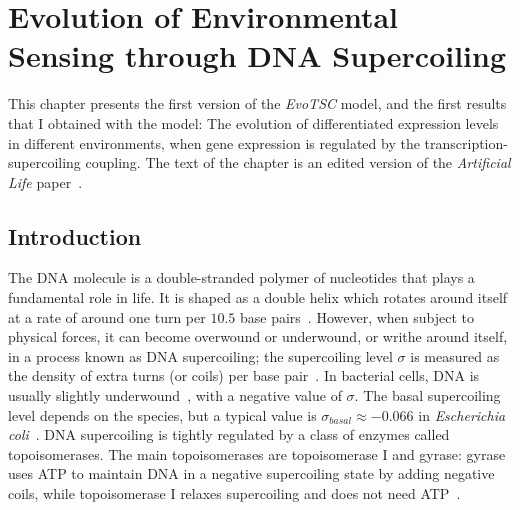 \chapter{Evolution of Environmental Sensing through DNA Supercoiling}
\label{chap:alife}

This chapter presents the first version of the \emph{EvoTSC} model, and the first results that I obtained with the model: The evolution of differentiated expression levels in different environments, when gene expression is regulated by the transcription-supercoiling coupling.
The text of the chapter is an edited version of the \emph{Artificial Life} paper~\citep{grohens2022a}.

\section{Introduction}
\label{sec:alife:intro}

The DNA molecule is a double-stranded polymer of nucleotides that plays a fundamental role in life.
It is shaped as a double helix which rotates around itself at a rate of around one turn per $10.5$ base pairs~\citep{krogh2018}.
However, when subject to physical forces, it can become overwound or underwound, or writhe around itself, in a process known as DNA supercoiling;
the supercoiling level $\sigma$ is measured as the density of extra turns (or coils) per base pair~\citep{duprey2021}.
In bacterial cells, DNA is usually slightly underwound~\citep{lal2016}, with a negative value of $\sigma$.
The basal supercoiling level depends on the species, but a typical value is $\sigma_{basal} \approx -0.066$ in \emph{Escherichia coli}~\citep{crozat2005}.
DNA supercoiling is tightly regulated by a class of enzymes called topoisomerases.
The main topoisomerases are topoisomerase I and gyrase: gyrase uses ATP to maintain DNA in a negative supercoiling state by adding negative coils, while topoisomerase I relaxes supercoiling and does not need ATP~\citep{martisb.2019}.

